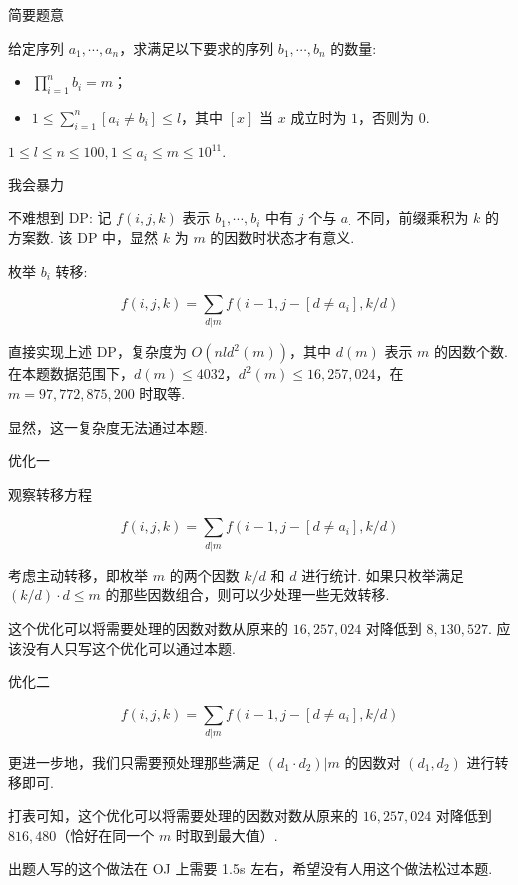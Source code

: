 \begin{frame}{简要题意}
	
	给定序列 $a_1, \cdots, a_n$，求满足以下要求的序列 $b_1, \cdots, b_n$ 的数量:
	\begin{itemize}
		\item $\prod_{i=1}^n b_i = m$；
		\item $1\le \sum_{i=1}^n \left[a_i \ne b_i\right] \le l$，其中 $[x]$ 当 $x$ 成立时为 $1$，否则为 $0$.
	\end{itemize}

	$1\le l\le n\le 100, 1\le a_i \le m \le 10^{11}.$

\end{frame}

\begin{frame}{我会暴力}
	
	不难想到 DP: 记 $f(i, j, k)$ 表示 $b_1, \cdots, b_i$ 中有 $j$ 个与 $a_\cdot$ 不同，前缀乘积为 $k$ 的方案数. 该 DP 中，显然 $k$ 为 $m$ 的因数时状态才有意义.

	枚举 $b_i$ 转移:

	$$f(i, j, k) = \sum_{d|m} f\left(i - 1, j - [d \ne a_i], k / d\right)$$

	直接实现上述 DP，复杂度为 $O\left(nld^2(m)\right)$，其中 $d(m)$ 表示 $m$ 的因数个数. 在本题数据范围下，$d(m) \le 4032$，$d^2(m) \le 16,257,024$，在 $m=97,772,875,200$ 时取等.
	
	显然，这一复杂度无法通过本题.

\end{frame}

\begin{frame}{优化一}
	
	观察转移方程

	$$f(i, j, k) = \sum_{d|m} f\left(i - 1, j - [d \ne a_i], k / d\right)$$

	考虑主动转移，即枚举 $m$ 的两个因数 $k/d$ 和 $d$ 进行统计. 如果只枚举满足 $(k/d) \cdot d \le m$ 的那些因数组合，则可以少处理一些无效转移.

	这个优化可以将需要处理的因数对数从原来的 $16,257,024$ 对降低到 $8,130,527$. 应该没有人只写这个优化可以通过本题.

\end{frame}

\begin{frame}{优化二}
	
	$$f(i, j, k) = \sum_{d|m} f\left(i - 1, j - [d \ne a_i], k / d\right)$$

	更进一步地，我们只需要预处理那些满足 $(d_1\cdot d_2) | m$ 的因数对 $\left(d_1, d_2\right)$ 进行转移即可.

	打表可知，这个优化可以将需要处理的因数对数从原来的 $16,257,024$ 对降低到 $816,480$（恰好在同一个 $m$ 时取到最大值）.
	
	出题人写的这个做法在 OJ 上需要 1.5s 左右，希望没有人用这个做法松过本题.

\end{frame}

